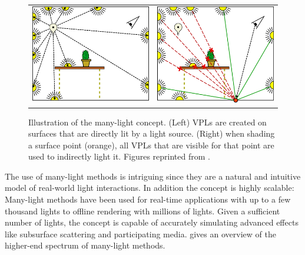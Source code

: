 \begin{figure}[htb]
\centering
  \begin{tabular}{@{}cc@{}}
    \includegraphics[width=.48\textwidth]{graphics/many_lights_laine_1} &
    \includegraphics[width=.48\textwidth]{graphics/many_lights_laine_2}\\
  \end{tabular}
  \caption{Illustration of the many-light concept. (Left) VPLs are created on surfaces that are directly lit by a light source. (Right) when shading a surface point (orange), all VPLs that are visible for that point are used to indirectly light it. Figures reprinted from \citet{laine2007incremental}.}
  \label{fig:intro:many_lights_visualization}
\end{figure}

The use of many-light methods is intriguing since they are a natural and intuitive model of real-world light interactions. In addition the concept is highly scalable: Many-light methods have been used for real-time applications with up to a few thousand lights to offline rendering with millions of lights. Given a sufficient number of lights, the concept is capable of accurately simulating advanced effects like subsurface scattering and participating media. \citet{Dachsbacher:2014:ManyLightsSTAR} gives an overview of the higher-end spectrum of many-light methods.

